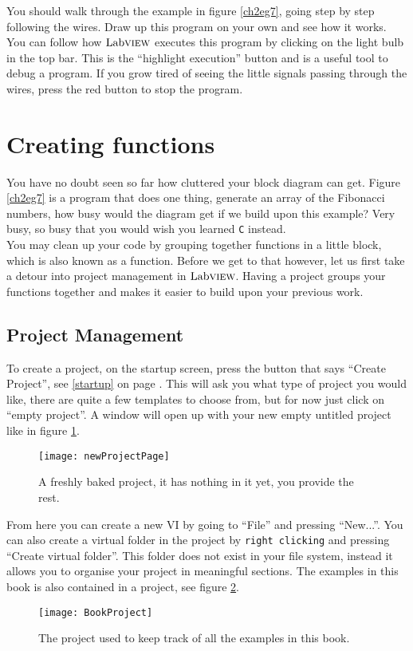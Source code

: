You should walk through the example in figure \ref{ch2eg7}, going step by step following the wires. Draw up this program on your own and see how it works. You can follow how $\text{Lab}\textsc{view}$ executes this program by clicking on the light bulb in the top bar. This is the ``highlight execution'' button and is a useful tool to debug a program. If you grow tired of seeing the little signals passing through the wires, press the red button to stop the program.

\section{Creating functions}
You have no doubt seen so far how cluttered your block diagram can get. Figure \ref{ch2eg7} is a program that does one thing, generate an array of the Fibonacci numbers, how busy would the diagram get if we build upon this example? Very busy, so busy that you would wish you learned \texttt{C} instead.\\

You may clean up your code by grouping together functions in a little block, which is also known as a function. Before we get to that however, let us first take a detour into project management in $\text{Lab}\textsc{view}$. Having a project groups your functions together and makes it easier to build upon your previous work.\\

\subsection{Project Management}
To create a project, on the startup screen, press the button that says ``Create Project'', see \ref{startup} on page \pageref{startup}. This will ask you what type of project you would like, there are quite a few templates to choose from, but for now just click on ``empty project''. A window will open up with your new empty untitled project like in figure \ref{newProjectPage}.\\
\begin{figure}
	\centering
	\texttt{[image: newProjectPage]}
	\caption{A freshly baked project, it has nothing in it yet, you provide the rest.}
	\label{newProjectPage}
\end{figure}

From here you can create a new VI by going to ``File'' and pressing ``New...''. You can also create a virtual folder in the project by \texttt{right clicking} and pressing ``Create virtual folder''. This folder does not exist in your file system, instead it allows you to organise your project in meaningful sections. The examples in this book is also contained in a project, see figure \ref{BookProject}.\\
\begin{figure}
	\centering
	\texttt{[image: BookProject]}
	\caption{The project used to keep track of all the examples in this book.}
	\label{BookProject}
\end{figure}

